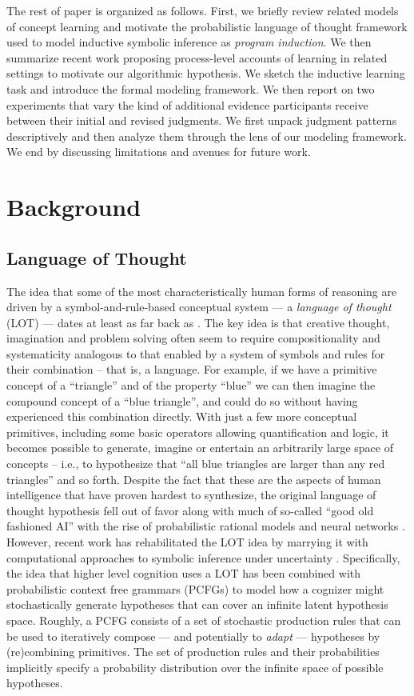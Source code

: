 \documentclass[doc,natbib,floatsintext]{apa7}
\begin{document}
The rest of paper is organized as follows. First, we briefly review related models of concept learning and motivate the probabilistic language of thought framework used to model inductive symbolic inference as \textit{program induction}. We then summarize recent work proposing process-level accounts of learning in related settings to motivate our algorithmic hypothesis. We sketch the inductive learning task and introduce the formal modeling framework. We then report on two experiments that vary the kind of additional evidence participants receive between their initial and revised judgments. We first unpack judgment patterns descriptively and then analyze them through the lens of our modeling framework. We end by discussing limitations and avenues for future work.

\section{Background}

\subsection{Language of Thought}
The idea that some of the most characteristically human forms of reasoning are driven by a symbol-and-rule-based conceptual system --- a \textit{language of thought} (LOT) --- dates at least as far back as \cite{fodor1975language}. The key idea is that creative thought, imagination and problem solving often seem to require compositionality and systematicity analogous to that enabled by a system of symbols and rules for their combination -- that is, a language. For example, if we have a primitive concept of a  ``triangle'' and of the property ``blue'' we can then imagine the compound concept of a ``blue triangle'', and could do so without having experienced this combination directly. With just a few more conceptual primitives, including some basic operators allowing quantification and logic, it becomes possible to generate, imagine or entertain an arbitrarily large space of concepts -- i.e., to hypothesize that ``all blue triangles are larger than any red triangles'' and so forth. Despite the fact that these are the aspects of human intelligence that have proven hardest to synthesize, the original language of thought hypothesis fell out of favor along with much of so-called ``good old fashioned AI'' with the rise of probabilistic rational models and neural networks \citep{chater1990autonomy}. However, recent work has rehabilitated the LOT idea by marrying it with computational approaches to symbolic inference under uncertainty \citep{piantadosi2016four, yang2022one}. Specifically, the idea that higher level cognition uses a LOT has been combined with probabilistic context free grammars (PCFGs) to model how a cognizer might stochastically generate hypotheses that can cover an infinite latent hypothesis space. Roughly, a PCFG consists of a set of stochastic production rules that can be used to iteratively compose --- and potentially to \textit{adapt} --- hypotheses by (re)combining primitives. The set of production rules and their probabilities implicitly specify a probability distribution over the infinite space of possible hypotheses.
\end{document}
